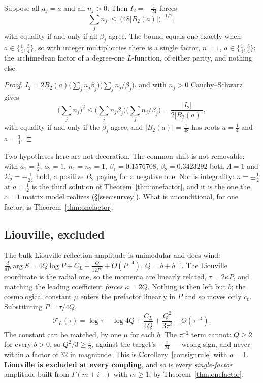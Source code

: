 \begin{proposition}\label{prop:rigidity}
Suppose all $a_j=a$ and all $n_j>0$. Then $I_2=-\frac1{24}$ forces
\[
 \sum_jn_j\ \leq\ \big(48|B_2(a)|\big)^{-1/2},
\]
with equality if and only if all $\beta_j$ agree. The bound equals one exactly
when $a\in\{\frac14,\frac34\}$, so with integer multiplicities there is a single
factor, $n=1$, $a\in\{\frac14,\frac34\}$: the archimedean factor of a degree-one
$L$-function, of either parity, and nothing else.
\end{proposition}

\begin{proof}
$I_2=2B_2(a)\big(\sum_jn_j\beta_j\big)\big(\sum_jn_j/\beta_j\big)$, and with
$n_j>0$ Cauchy--Schwarz gives
\[
 \Big(\sum_jn_j\Big)^2\leq\Big(\sum_jn_j\beta_j\Big)\Big(\sum_jn_j/\beta_j\Big)
 =\frac{|I_2|}{2|B_2(a)|},
\]
with equality if and only if the $\beta_j$ agree; and $|B_2(a)|=\frac1{48}$ has
roots $a=\frac14$ and $a=\frac34$.
\end{proof}

Two hypotheses here are not decoration. The common shift is not removable: with
$a_1=\frac12$, $a_2=1$, $n_1=n_2=1$, $\beta_1=0.1576708$, $\beta_2=0.3423292$ both
$\Lambda=1$ and $\Sigma_2=-\frac1{24}$ hold, a positive $B_2$ paying for a
negative one. Nor is integrality: $n=\pm\frac12$ at $a=\frac12$ is the third
solution of Theorem~\ref{thm:onefactor}, and it is the one the $c=1$ matrix model
realizes (\S\ref{ssec:survey}). What is unconditional, for one factor, is
Theorem~\ref{thm:onefactor}.

\subsection{Liouville, excluded}\label{ssec:liouville}

The bulk Liouville reflection amplitude is unimodular and does wind:
$\frac{d}{dP}\arg S=4Q\log P+C_L+\frac{Q}{12P^2}+O(P^{-4})$, $Q=b+b^{-1}$.
The Liouville coordinate is the radial one, so the momenta are linearly related,
$\tau=2\kappa P$, and matching the leading coefficient \emph{forces} $\kappa=2Q$.
Nothing is then left but $b$; the cosmological constant $\mu$ enters the
prefactor linearly in $P$ and so moves only $c_0$. Substituting $P=\tau/4Q$,
\[
 \mathcal T_L(\tau)=\log\tau-\log4Q+\frac{C_L}{4Q}+\frac{Q^2}{3\tau^2}+O(\tau^{-4}) .
\]
The constant can be matched, by one $\mu$ for each $b$. The $\tau^{-2}$ term
cannot: $Q\geq2$ for every $b>0$, so $Q^2/3\geq\frac43$, against the target's
$-\frac1{24}$ --- wrong sign, and never within a factor of $32$ in magnitude.
This is Corollary~\ref{cor:signrule} with $a=1$. \textbf{Liouville is excluded at
every coupling}, and so is every \emph{single-factor} amplitude built from
$\Gamma(m+i\,\cdot)$ with $m\geq1$, by Theorem~\ref{thm:onefactor}.

